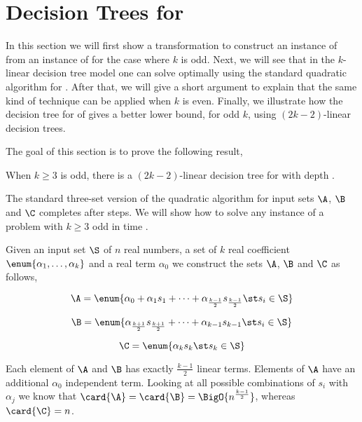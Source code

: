 \section{Decision Trees for \kLDT}
\label{tree:3sum:kldt}

In this section we will first show a transformation to construct an instance
of \threeSUM from an instance of \kLDT for the case where \(k\) is odd. Next, we will
see that in the \(k\)-linear decision tree model one can solve \kLDT optimally
using the standard quadratic algorithm for \threeSUM. After that, we will give a
short argument to explain that the same kind of technique can be applied when
\(k\) is even. Finally, we illustrate how the decision tree for \threeSUM of
\citet*{gronlund:2014} gives a better lower bound, for odd \(k\), using
\((2k-2)\)-linear decision trees.

The goal of this section is to prove the following result,

\begin{theorem}
When $k \ge 3$ is odd, there is a $(2k-2)$-linear decision tree for \kLDT with
depth .
\end{theorem}

The standard three-set version of the quadratic \threeSUM algorithm for input
sets \(\A\), \(\B\) and \(\C\) completes after \BigO{\card{\C} ( \card{\A} +
\card{\B} ) } steps. We will show how to solve any instance of a \kLDT problem
with \(k \ge 3\) odd in time .

Given an input set \(\S\) of \(n\) real numbers, a set of \(k\) real
coefficient \( \enum{\alpha_1,\ldots,\alpha_k}\) and a real term \(\alpha_0\)
we construct the sets \(\A\), \(\B\) and \(\C\) as follows,

\begin{displaymath}
\A = \enum{\alpha_0 + \alpha_1 s_1 + \cdots + \alpha_{\frac{k-1}{2}} s_{\frac{k-1}{2}} \st s_i \in \S}
\end{displaymath}

\begin{displaymath}
\B = \enum{\alpha_{\frac{k+1}{2}} s_{\frac{k+1}{2}} + \cdots + \alpha_{k-1} s_{k-1} \st s_i \in \S}
\end{displaymath}

\begin{displaymath}
\C = \enum{\alpha_k s_k \st s_k \in \S}
\end{displaymath}

Each element of \(\A\) and \(\B\) has exactly \(\frac{k-1}{2}\) linear terms.
Elements of \(\A\) have an additional \(\alpha_0\) independent term. Looking
at all possible combinations of \(s_i\) with \(\alpha_j\) we know that
\(\card{\A} = \card{\B} = \BigO{n^{\frac{k-1}{2}}}\), whereas \(\card{\C} =
n\).

